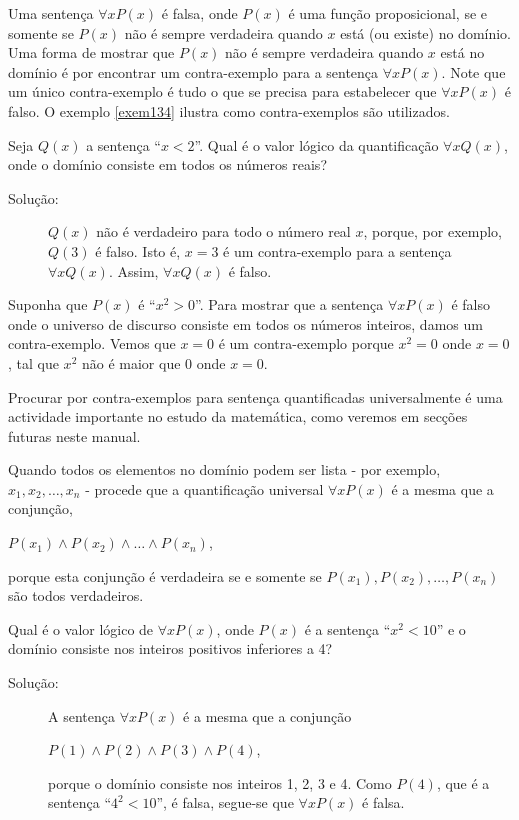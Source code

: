 Uma sentença $\forall xP(x)$ é falsa, onde $P(x)$ é uma função proposicional, se
e somente se $P(x)$ não é sempre verdadeira quando $x$ está (ou existe) no
domínio. Uma forma de mostrar que $P(x)$ não é sempre verdadeira quando $x$ está
no domínio é por encontrar um contra-exemplo para a sentença $\forall xP(x)$.
Note que um único contra-exemplo é tudo o que se precisa para estabelecer que
$\forall xP(x)$ é falso. O exemplo \ref{exem134} ilustra como contra-exemplos
são utilizados.

\begin{exmp}
\label{exem134}
Seja $Q(x)$ a sentença ``$x < 2$''. Qual é o valor lógico da quantificação
$\forall xQ(x)$, onde o domínio consiste em todos os números reais?
\end{exmp}
\begin{description}
\item[Solução:] $Q(x)$ não é verdadeiro para todo o número real $x$, porque, por
exemplo, $Q(3)$ é falso. Isto é, $x=3$ é um contra-exemplo para a sentença
$\forall xQ(x)$. Assim, $\forall xQ(x)$ é falso.
\end{description}

\begin{exmp}
\label{exem135}
Suponha que $P(x)$ é ``$x^2 > 0$''. Para mostrar que a sentença $\forall xP(x)$
é falso onde o universo de discurso consiste em todos os números inteiros, damos
um contra-exemplo. Vemos que $x = 0$ é um contra-exemplo porque $x^2 = 0$ onde
$x = 0$, tal que $x^2$ não é maior que $0$ onde $x=0$.
\end{exmp}

Procurar por contra-exemplos para sentença quantificadas universalmente é uma
actividade importante no estudo da matemática, como veremos em secções futuras
neste manual.

Quando todos os elementos no domínio podem ser lista - por exemplo, $x_1, x_2,
\ldots, x_n$ - procede que a quantificação universal $\forall xP(x)$ é a mesma
que a conjunção,
\begin{center}
$P(x_1) \land P(x_2) \land \ldots \land P(x_n)$,
\end{center}
porque esta conjunção é verdadeira se e somente se $P(x_1),P(x_2),\ldots,P(x_n)$
são todos verdadeiros.

\begin{exmp}
\label{exem136}
Qual é o valor lógico de $\forall xP(x)$, onde $P(x)$ é a sentença ``$x^2 <
10$'' e o domínio consiste nos inteiros positivos inferiores a 4?
\end{exmp}
\begin{description}
\item[Solução:] A sentença $\forall xP(x)$ é a mesma que a conjunção
\begin{center}$P(1) \land P(2) \land P(3) \land P(4)$,\end{center}
porque o domínio consiste nos inteiros 1, 2, 3 e 4. Como $P(4)$, que é a
sentença ``$4^2 < 10$'', é falsa, segue-se que $\forall xP(x)$ é falsa.
\end{description}


